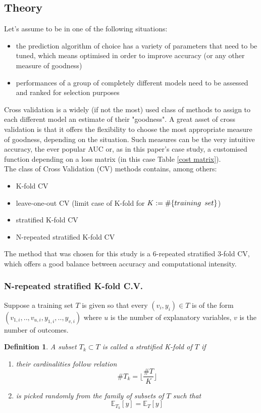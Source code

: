 \documentclass[a4paper,12pt]{article}
\newtheorem{definition}{Definition}[section]
\begin{document}
\subsection{Theory}
Let's assume to be in one of the following situations: 
\begin{itemize}
\item the prediction algorithm of choice has a variety of parameters that need to be tuned, which means optimised in order to improve accuracy (or any other measure of goodness)
\item performances of a group of completely different models need to be assessed and ranked for selection purposes
\end{itemize}
Cross validation is a widely (if not the most) used class of methods to assign to each different model an estimate of their "goodness". A great asset of cross validation is that it offers the flexibility to choose the most appropriate measure of goodness, depending on the situation. Such measures can be the very intuitive accuracy, the ever popular AUC or, as in this paper's case study, a customised function depending on a loss matrix (in this case Table \ref{cost matrix}).\\
The class of Cross Validation (CV) methods contains, among others:
\begin{itemize}
\item K-fold CV
\item leave-one-out CV (limit case of K-fold for $K:= \# \{ training \enskip set\}$)
\item stratified K-fold CV
\item N-repeated stratified K-fold CV
\end{itemize}
The method that was chosen for this study is a 6-repeated  stratified 3-fold CV, which offers a good balance between accuracy and computational intensity. 

\subsubsection*{N-repeated stratified K-fold C.V.}\label{Sub::stratified}

Suppose a training set $T$ is given so that every $(v_{i}, y_{i}) \in T$ is of the form $(v_{1,i}, .., v_{u,i}, y_{1,i}, .., y_{v,i})$ where $u$ is the number of explanatory variables, $v$ is the number of outcomes.

\begin{definition}
A subset $T_{k} \subset T$ is called a stratified K-fold of $T$ if 
\begin{enumerate}
\item their cardinalities follow relation $$ \# T_{k} = \Big\lfloor \frac{\#T}{K} \Big\rfloor $$
\item is picked randomly from the family of subsets of $T$ such that $$ \mathbb{E}_{T_{k}} [y] = \mathbb{E}_{T} [y]$$
\end{enumerate}
\end{definition}
\end{document}
